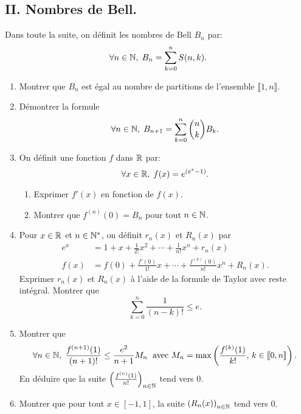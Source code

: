 \subsection*{II. Nombres de Bell.}
Dans toute la suite, on définit les nombres de Bell $B_n$ par:
\[
 \forall n \in \mathbb{N}, \; B_n = \sum_{k=0}^n S(n,k).
\]
\begin{enumerate}
 \item Montrer que $B_n$ est égal au nombre de partitions de l'ensemble $\llbracket 1,n \rrbracket$.
 \item Démontrer la formule
\[
 \forall n \in \mathbb{N}, \; B_{n+1} = \sum_{k=0}^{n}\binom{n}{k} B_k.
\]
 \item On définit une fonction $f$ dans $\mathbb{R}$ par:
\[
 \forall x \in \mathbb{R}, \; f(x) = e^{\left( e^{x} - 1\right) }.
\]
\begin{enumerate}
 \item Exprimer $f'(x)$ en fonction de $f(x)$.
 \item Montrer que $f^{(n)}(0) = B_n$ pour tout $n\in \mathbb{N}$.
\end{enumerate}

 \item Pour $x\in \mathbb{R}$ et $n\in \mathbb{N}^*$, on définit $r_n(x)$ et $R_n(x)$ par 
\begin{align*}
 e^x &= 1 + x + \frac{1}{2!}x^2 + \cdots + \frac{1}{n!}x^n + r_n(x) \\
 f(x) &= f(0) + \frac{f'(0)}{1!}x + \cdots + \frac{f^{(n)}(0)}{n!}x^n + R_n(x).
\end{align*}
Exprimer $r_n(x)$ et $R_n(x)$ à l'aide de la formule de Taylor avec reste intégral.\newline
Montrer que 
\[
 \sum_{k=0}^n\frac{1}{(n-k)!} \leq e.
\]

 \item Montrer que
\[
 \forall n \in \mathbb{N},\; \frac{f^{(n+1)}(1)}{(n+1)!} \leq \frac{e^2}{n+1} M_n\; \text{ avec }
 M_n = \max\left( \frac{f^{(k)}(1)}{k!}, \, k\in \llbracket 0,n\rrbracket \right). 
\]
En déduire que la suite $\left( \frac{f^{(n)}(1)}{n!} \right)_{n \in \mathbb{N}}$ tend vers $0$.

  \item Montrer que pour tout $x\in \left[ -1, 1 \right]$, la suite $\left( R_n(x) \right)_{n \in \mathbb{N}}$ tend vers $0$. 
\end{enumerate}

